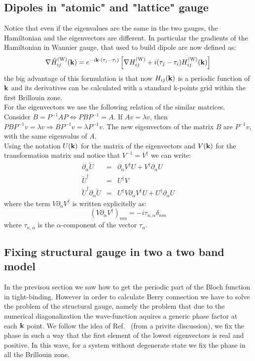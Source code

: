 \documentclass[preprint,showpacs,prb,superscriptaddress,aps,floatfix]{revtex4-1}
\newcommand{\kk}{{\bf k}}
\newcommand{\be}{\begin{equation}}
\newcommand{\ee}{\end{equation}}
\newcommand{\bea}{\begin{eqnarray}}
\newcommand{\eea}{\end{eqnarray}}
\renewcommand{\[}{\left[}
\renewcommand{\]}{\right]}
\renewcommand{\(}{\left(}
\renewcommand{\)}{\right)}
\def\pw{^{({\rm W})}}
\begin{document}
\subsection{Dipoles in "atomic" and "lattice" gauge}
Notice that even if the eigenvalues are the same in the two gauges, the Hamiltonian and the eigenvectors are different. In particular the gradients of the Hamiltonian in Wannier gauge, that used to build dipole are now defined as:
\be
\nabla \tilde H_{ij}\pw(\kk)=e^{-i \kk \cdot (\tau_j -\tau_i)} \left [ \nabla H_{ij}\pw + i(\tau_j -\tau_i) H_{ij}\pw(\kk) \right ]
\ee
the big advantage of this formulation is that now $H_{ij}(\kk)$ is a periodic function of  $\kk$ and its derivatives can be calculated with a standard k-points grid within the first Brillouin zone.\\
For the eigenvectors we use the following relation of the similar matrices. Consider $B=P^{-1}AP \Longleftrightarrow  P B P^{-1} =A$. If $Av=\lambda v$, then $PBP^{-1} v = \lambda v \Longrightarrow BP^{-1} v = \lambda P^{-1} v $. The new eigenvectors of the matrix $B$ are $P^{-1} v$, with the same eigenvalus of $A$.\\
Using the notation $U(\kk)$ for the matrix of the eigenvectors and $V(\kk)$ for the transformation matrix and notice that $V^{-1} = V^{\dagger}$ we can write:
\bea
\partial_\alpha \tilde U &=& \partial_\alpha V^{\dagger} U + V^{\dagger} \partial_\alpha U \\
\tilde U^{\dagger} &=& U^{\dagger} V \\
\tilde U^{\dagger} \partial_\alpha \tilde U &=& U^{\dagger} V \partial_\alpha V^{\dagger} U + U^{\dagger} \partial_\alpha U
\eea
where the term $V \partial_\alpha V^{\dagger}$ is written explicitelly as:
\be
(V \partial_\alpha V^{\dagger})_{nm}=-i\tau_{n,\alpha}\delta_{nm}
\ee
where $\tau_{n,\alpha}$ is the $\alpha$-component of the vector $\tau_n$.

\subsection{Fixing structural gauge in two a two band model}
In the previsou section we saw how to get the periodic part of the Bloch function in tight-binding. However in order to calculate Berry connection we have to solve the problem of the structural gauge,\cite{yue2022introduction} namely the problem that due to the numerical diagonalization the wave-function aquires a generic phase factor at each $\kk$ point. We follow the idea of Ref.~ (from a privite discussion), we fix the phase in such a way that the first element of the lowest eigenvectors is real and positive. In this wave, for a system without degenerate state we fix the phase in all the  Brillouin zone.
\end{document}

